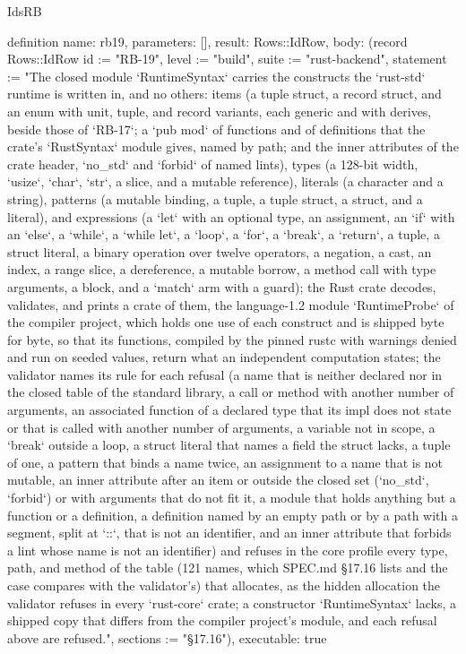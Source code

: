\begin{lexlean}{IdsRB}
\begin{semanticmodule}
definition{
  name: rb19,
  parameters: [],
  result: Rows::IdRow,
  body: (record Rows::IdRow {id := "RB-19", level := "build", suite := "rust-backend", statement := "The closed module `RuntimeSyntax` carries the constructs the `rust-std` runtime is written in, and no others: items (a tuple struct, a record struct, and an enum with unit, tuple, and record variants, each generic and with derives, beside those of `RB-17`; a `pub mod` of functions and of definitions that the crate's `RustSyntax` module gives, named by path; and the inner attributes of the crate header, `no_std` and `forbid` of named lints), types (a 128-bit width, `usize`, `char`, `str`, a slice, and a mutable reference), literals (a character and a string), patterns (a mutable binding, a tuple, a tuple struct, a struct, and a literal), and expressions (a `let` with an optional type, an assignment, an `if` with an `else`, a `while`, a `while let`, a `loop`, a `for`, a `break`, a `return`, a tuple, a struct literal, a binary operation over twelve operators, a negation, a cast, an index, a range slice, a dereference, a mutable borrow, a method call with type arguments, a block, and a `match` arm with a guard); the Rust crate decodes, validates, and prints a crate of them, the language-1.2 module `RuntimeProbe` of the compiler project, which holds one use of each construct and is shipped byte for byte, so that its functions, compiled by the pinned rustc with warnings denied and run on seeded values, return what an independent computation states; the validator names its rule for each refusal (a name that is neither declared nor in the closed table of the standard library, a call or method with another number of arguments, an associated function of a declared type that its impl does not state or that is called with another number of arguments, a variable not in scope, a `break` outside a loop, a struct literal that names a field the struct lacks, a tuple of one, a pattern that binds a name twice, an assignment to a name that is not mutable, an inner attribute after an item or outside the closed set (`no_std`, `forbid`) or with arguments that do not fit it, a module that holds anything but a function or a definition, a definition named by an empty path or by a path with a segment, split at `::`, that is not an identifier, and an inner attribute that forbids a lint whose name is not an identifier) and refuses in the core profile every type, path, and method of the table (121 names, which SPEC.md §17.16 lists and the case compares with the validator's) that allocates, as the hidden allocation the validator refuses in every `rust-core` crate; a constructor `RuntimeSyntax` lacks, a shipped copy that differs from the compiler project's module, and each refusal above are refused.", sections := "§17.16"}),
  executable: true
}


\end{semanticmodule}
\end{lexlean}
